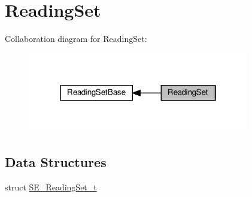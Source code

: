 \hypertarget{group__ReadingSet}{}\section{Reading\+Set}
\label{group__ReadingSet}
Collaboration diagram for Reading\+Set\+:\nopagebreak
\begin{figure}[H]
\begin{center}
\leavevmode
\includegraphics[width=274pt]{group__ReadingSet}
\end{center}
\end{figure}
\subsection*{Data Structures}
\begin{DoxyCompactItemize}
\item 
struct \hyperlink{structSE__ReadingSet__t}{S\+E\+\_\+\+Reading\+Set\+\_\+t}
\end{DoxyCompactItemize}
